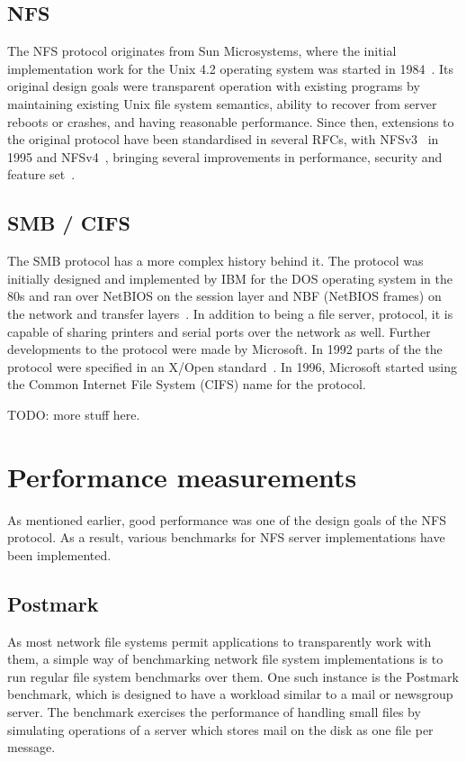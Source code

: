\subsection{NFS}

The NFS protocol originates from Sun Microsystems, where the initial implementation work for the
Unix 4.2 operating system was started in 1984~\cite{NFS}. Its original design goals were
transparent operation with existing programs by maintaining existing Unix file system
semantics, ability to recover from server reboots or crashes, and having reasonable
performance. Since then, extensions to the original protocol have been standardised
in several RFCs, with NFSv3~\cite{NFSv3RFC} in 1995 and NFSv4~\cite{NFSv4RFC},
bringing several improvements in performance, security and feature set~\cite{NFSv4Better}.

\subsection{SMB / CIFS}

The SMB protocol has a more complex history behind it. The protocol was initially designed
and implemented by IBM for the DOS operating system in the 80s
and ran over NetBIOS on the session layer and NBF (NetBIOS frames) on the network and transfer layers~\cite{CifsBook}.
In addition to being a file server, protocol, it is capable of sharing printers and serial ports over the network as well.
Further developments to the protocol were made by Microsoft.
In 1992 parts of the the protocol were specified in an X/Open standard~\cite{XopenSmbSpec}.
In 1996, Microsoft started using the Common Internet File System (CIFS) name for the protocol.

TODO: more stuff here.

\section{Performance measurements} \label{sect:PerfMeasurements}

As mentioned earlier, good performance was one of the design goals of the NFS protocol.
As a result, various benchmarks for NFS server implementations have been implemented.

\subsection{Postmark}
As most network file systems permit applications to transparently work with them,
a simple way of benchmarking network file system implementations is to run regular file system benchmarks over them.
One such instance is the Postmark benchmark, which is designed to have a workload similar to a mail or newsgroup server.
The benchmark exercises the performance of handling small files by simulating operations of a server which
stores mail on the disk as one file per message.


